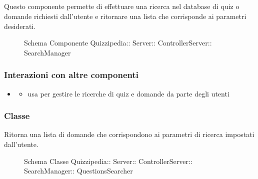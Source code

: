 \subsection{}
Questo componente permette di effettuare una ricerca nel database di quiz o domande richiesti dall'utente e ritornare una lista che corrisponde ai parametri desiderati.
\begin{figure}[H]
\centering
\noindent{}
\caption[Schema Componente SearchManager]{Schema Componente Quizzipedia:: Server:: ControllerServer:: SearchManager}
\end{figure}
\subsubsection{Interazioni con altre componenti}
\begin{itemize}
\item {}
\begin{itemize}
\item usa  per gestire le ricerche di quiz e domande da parte degli utenti
\end{itemize}
\end{itemize}
\subsubsection{Classe }
Ritorna una lista di domande che corrispondono ai parametri di ricerca impostati dall'utente.
\begin{figure}[H]
\centering
\noindent{}
\caption[Schema Classe QuestionsSearcher]{Schema Classe Quizzipedia:: Server:: ControllerServer:: SearchManager:: QuestionsSearcher}
\end{figure}
